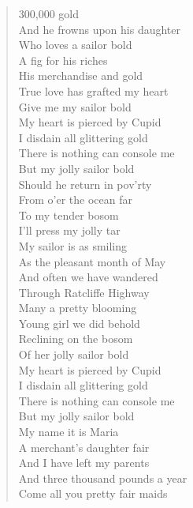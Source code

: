 \documentclass[11pt]{article}
\begin{document}
\begin{verse}
300,000 gold\\
And he frowns upon his daughter\\
Who loves a sailor bold\\
\vspace*{1em}
A fig for his riches\\
His merchandise and gold\\
True love has grafted my heart\\
Give me my sailor bold\\
\vspace*{1em}
My heart is pierced by Cupid\\
I disdain all glittering gold\\
There is nothing can console me\\
But my jolly sailor bold\\
\vspace*{1em}
Should he return in pov'rty\\
From o'er the ocean far\\
To my tender bosom\\
I'll press my jolly tar\\
\vspace*{1em}
My sailor is as smiling\\
As the pleasant month of May\\
And often we have wandered\\
Through Ratcliffe Highway\\
\vspace*{1em}
Many a pretty blooming\\
Young girl we did behold\\
Reclining on the bosom\\
Of her jolly sailor bold\\
\vspace*{1em}
My heart is pierced by Cupid\\
I disdain all glittering gold\\
There is nothing can console me\\
But my jolly sailor bold\\
\vspace*{1em}
My name it is Maria\\
A merchant's daughter fair\\
And I have left my parents\\
And three thousand pounds a year\\
\vspace*{1em}
Come all you pretty fair maids\\

\end{verse}
\end{document}
